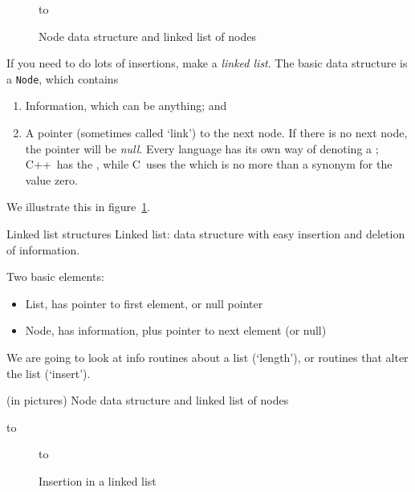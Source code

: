 \begin{figure}[ht]
\hbox to 
  \caption{Node data structure and linked list of nodes}
  \label{fig:linked-node-list}
\end{figure}

If you need to do lots of insertions, make a
\emph{linked list}. The basic data structure is a \lstinline{Node},
which contains 
\begin{enumerate}
\item
  Information, which can be anything; and
\item A pointer (sometimes called `link') to the next node. If there
  is no next node, the pointer will be
  \emph{null}. Every language has its own way of
  denoting a ; C++~has the
  , while C~uses the  which is
  no more than a synonym for the value zero.
\end{enumerate}

We illustrate this in figure~\ref{fig:linked-node-list}.

\begin{slide}{Linked list structures}
  \label{sl:linkedlist}
  Linked list: data structure with easy insertion and deletion of
  information.

  Two basic elements:
  \begin{itemize}
  \item List, has pointer to first element, or null pointer
  \item Node, has information, plus pointer to next element (or null)
  \end{itemize}
  We are going to look at info routines about a list (`length'), or
  routines that alter the list (`insert').
\end{slide}
\begin{slide}{(in pictures)}
  \label{sl:linkedlist-pic}
  Node data structure and linked list of nodes
  
\hbox to 
\end{slide}

\begin{figure}[ht]
  \hbox to 
  \caption{Insertion in a linked list}
  \label{fig:linked-list-insert}
\end{figure}

